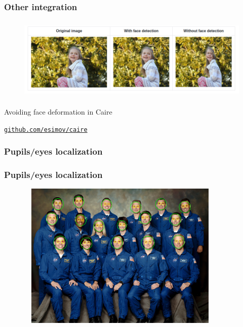\documentclass[9pt]{beamer}
\newcommand{\myblue} [1] {{\color{blue}#1}}
\begin{document}
\begin{frame}[fragile]
\frametitle{Other integration}


\begin{figure}[h]
\begin{center}
\includegraphics[width=12cm,height=4cm]{assets/caire-example.png}
\end{center}

\end{figure}

Avoiding face deformation in Caire


\myblue{\href{https://github.com/esimov/caire}{\texttt{github.com/esimov/caire}}}


\end{frame}

\begin{frame}[fragile]
\frametitle{Pupils/eyes localization}


\end{frame}

\begin{frame}[fragile]
\frametitle{Pupils/eyes localization}


\begin{figure}[h]
\begin{center}
\includegraphics[width=10cm,height=7cm]{assets/pigo_puploc.png}
\end{center}

\end{figure}


\end{frame}
\end{document}

